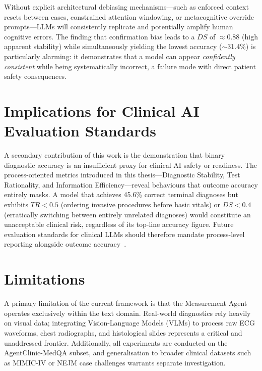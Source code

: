 Without explicit architectural debiasing mechanisms---such as enforced context resets between cases, constrained attention windowing, or metacognitive override prompts---LLMs will consistently replicate and potentially amplify human cognitive errors. The finding that confirmation bias leads to a $DS$ of $\approx$0.88 (high apparent stability) while simultaneously yielding the lowest accuracy ($\sim$31.4\%) is particularly alarming: it demonstrates that a model can appear \textit{confidently consistent} while being systematically incorrect, a failure mode with direct patient safety consequences.

\section{Implications for Clinical AI Evaluation Standards}

A secondary contribution of this work is the demonstration that binary diagnostic accuracy is an insufficient proxy for clinical AI safety or readiness. The process-oriented metrics introduced in this thesis---Diagnostic Stability, Test Rationality, and Information Efficiency---reveal behaviours that outcome accuracy entirely masks. A model that achieves 45.6\% correct terminal diagnoses but exhibits $TR < 0.5$ (ordering invasive procedures before basic vitals) or $DS < 0.4$ (erratically switching between entirely unrelated diagnoses) would constitute an unacceptable clinical risk, regardless of its top-line accuracy figure. Future evaluation standards for clinical LLMs should therefore mandate process-level reporting alongside outcome accuracy~\cite{johri2023guidelines}.

\section{Limitations}

A primary limitation of the current framework is that the Measurement Agent operates exclusively within the text domain. Real-world diagnostics rely heavily on visual data; integrating Vision-Language Models (VLMs) to process raw ECG waveforms, chest radiographs, and histological slides represents a critical and unaddressed frontier. Additionally, all experiments are conducted on the AgentClinic-MedQA subset, and generalisation to broader clinical datasets such as MIMIC-IV or NEJM case challenges warrants separate investigation.
